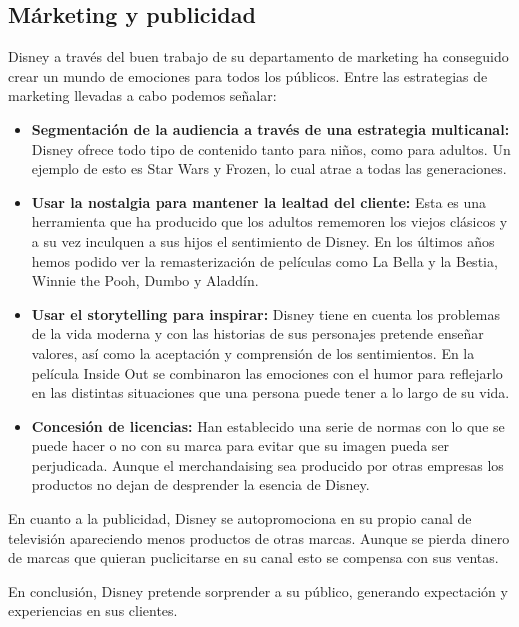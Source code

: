 \subsection{Márketing y publicidad}

Disney a través del buen trabajo de su departamento de marketing ha conseguido crear un mundo de emociones para todos los públicos. Entre las estrategias de marketing llevadas a cabo podemos señalar:


\begin{itemize}

\item
\textbf{Segmentación de la audiencia a través de una estrategia multicanal:} Disney ofrece todo tipo de contenido tanto para niños, como para adultos. Un ejemplo de esto es Star Wars y Frozen, lo cual atrae a todas las generaciones.

\item
\textbf{Usar la nostalgia para mantener la lealtad del cliente:} Esta es una herramienta que ha producido que los adultos rememoren los viejos clásicos y a su vez inculquen a sus hijos el sentimiento de Disney. En los últimos años hemos podido ver la remasterización de películas como La Bella y la Bestia, Winnie the Pooh, Dumbo y Aladdín.

\item
\textbf{Usar el storytelling para inspirar:} Disney tiene en cuenta los problemas de la vida moderna y con las historias de sus personajes pretende enseñar valores, así como la aceptación y comprensión de los sentimientos. En la película Inside Out se combinaron las emociones con el humor para reflejarlo en las distintas situaciones que una persona puede tener a lo largo de su vida.

\item
\textbf{Concesión de licencias:} Han establecido una serie de normas con lo que se puede hacer o no con su marca para evitar que su imagen pueda ser perjudicada. Aunque el merchandaising sea producido por otras empresas los productos no dejan de desprender la esencia de Disney.

\end{itemize}

En cuanto a la publicidad, Disney se autopromociona en su propio canal de televisión apareciendo menos productos de otras marcas. Aunque se pierda dinero de marcas que quieran puclicitarse en su canal esto se compensa con sus ventas.

En conclusión, Disney pretende sorprender a su público, generando expectación y experiencias en sus clientes.